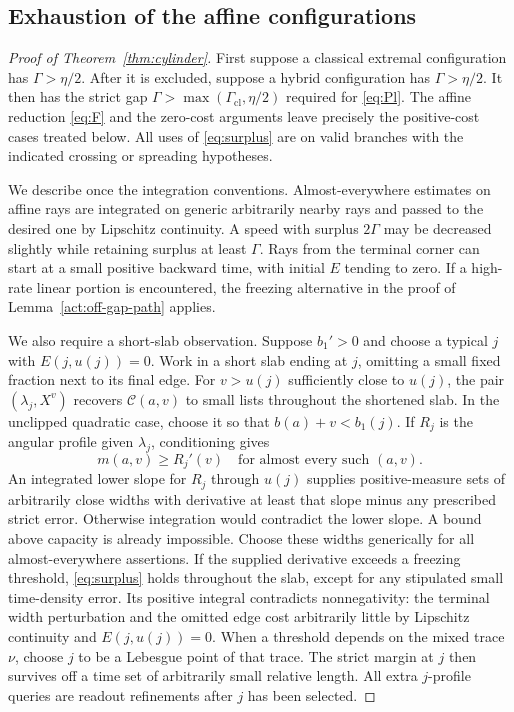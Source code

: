 \subsection{Exhaustion of the affine configurations}

\begin{proof}[Proof of Theorem~\ref{thm:cylinder}]
First suppose a classical extremal configuration has
$\Gamma>\eta/2$.  After it is excluded, suppose a hybrid
configuration has $\Gamma>\eta/2$.  It then has the strict gap
$\Gamma>\max(\Gamma_{\mathrm{cl}},\eta/2)$ required for
\eqref{eq:Pl}.  The affine reduction \eqref{eq:F} and the
zero-cost arguments leave precisely the positive-cost cases
treated below.  All uses of \eqref{eq:surplus} are on valid
branches with the indicated crossing or spreading hypotheses.

We describe once the integration conventions.  Almost-everywhere
estimates on affine rays are integrated on generic arbitrarily
nearby rays and passed to the desired one by Lipschitz continuity.
A speed with surplus $2\Gamma$ may be decreased slightly while
retaining surplus at least $\Gamma$.  Rays from the terminal
corner can start at a small positive backward time, with initial
$E$ tending to zero.  If a high-rate linear portion is encountered,
the freezing alternative in the proof of
Lemma~\ref{act:off-gap-path} applies.

We also require a short-slab observation.  Suppose $b_1'>0$ and
choose a typical $j$ with $E(j,u(j))=0$.  Work in a short slab
ending at $j$, omitting a small fixed fraction next to its final
edge.  For $v>u(j)$ sufficiently close to $u(j)$, the pair
$(\lambda_j,X^v)$ recovers $\mathcal C(a,v)$ to small lists
throughout the shortened slab.  In the unclipped quadratic case,
choose it so that $b(a)+v<b_1(j)$.  If $R_j$ is the angular
profile given $\lambda_j$, conditioning gives
\begin{equation}\label{act:slab-trace}
 m(a,v)\ge R_j'(v)
 \quad\text{for almost every such }(a,v).
\end{equation}
An integrated lower slope for $R_j$ through $u(j)$ supplies
positive-measure sets of arbitrarily close widths with derivative
at least that slope minus any prescribed strict error.  Otherwise
integration would contradict the lower slope.  A bound above
capacity is already impossible.  Choose these widths generically
for all almost-everywhere assertions.  If the supplied derivative
exceeds a freezing threshold, \eqref{eq:surplus} holds throughout
the slab, except for any stipulated small time-density error.
Its positive integral contradicts nonnegativity: the terminal
width perturbation and the omitted edge cost arbitrarily little
by Lipschitz continuity and $E(j,u(j))=0$.
When a threshold depends on the mixed trace $\nu$, choose $j$
to be a Lebesgue point of that trace.  The strict margin at $j$
then survives off a time set of arbitrarily small relative length.
All extra $j$-profile queries are readout refinements after $j$
has been selected.


\end{proof}
